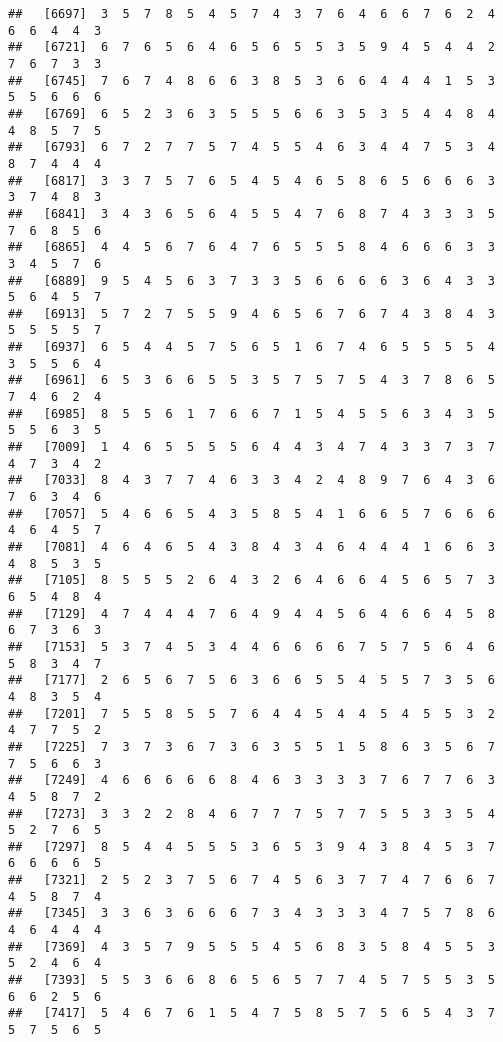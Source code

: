 \documentclass[
]{book}
\begin{document}
\begin{verbatim}
##   [6697]  3  5  7  8  5  4  5  7  4  3  7  6  4  6  6  7  6  2  4  6  6  4  4  3
##   [6721]  6  7  6  5  6  4  6  5  6  5  5  3  5  9  4  5  4  4  2  7  6  7  3  3
##   [6745]  7  6  7  4  8  6  6  3  8  5  3  6  6  4  4  4  1  5  3  5  5  6  6  6
##   [6769]  6  5  2  3  6  3  5  5  5  6  6  3  5  3  5  4  4  8  4  4  8  5  7  5
##   [6793]  6  7  2  7  7  5  7  4  5  5  4  6  3  4  4  7  5  3  4  8  7  4  4  4
##   [6817]  3  3  7  5  7  6  5  4  5  4  6  5  8  6  5  6  6  6  3  3  7  4  8  3
##   [6841]  3  4  3  6  5  6  4  5  5  4  7  6  8  7  4  3  3  3  5  7  6  8  5  6
##   [6865]  4  4  5  6  7  6  4  7  6  5  5  5  8  4  6  6  6  3  3  3  4  5  7  6
##   [6889]  9  5  4  5  6  3  7  3  3  5  6  6  6  6  3  6  4  3  3  5  6  4  5  7
##   [6913]  5  7  2  7  5  5  9  4  6  5  6  7  6  7  4  3  8  4  3  5  5  5  5  7
##   [6937]  6  5  4  4  5  7  5  6  5  1  6  7  4  6  5  5  5  5  4  3  5  5  6  4
##   [6961]  6  5  3  6  6  5  5  3  5  7  5  7  5  4  3  7  8  6  5  7  4  6  2  4
##   [6985]  8  5  5  6  1  7  6  6  7  1  5  4  5  5  6  3  4  3  5  5  5  6  3  5
##   [7009]  1  4  6  5  5  5  5  6  4  4  3  4  7  4  3  3  7  3  7  4  7  3  4  2
##   [7033]  8  4  3  7  7  4  6  3  3  4  2  4  8  9  7  6  4  3  6  7  6  3  4  6
##   [7057]  5  4  6  6  5  4  3  5  8  5  4  1  6  6  5  7  6  6  6  4  6  4  5  7
##   [7081]  4  6  4  6  5  4  3  8  4  3  4  6  4  4  4  1  6  6  3  4  8  5  3  5
##   [7105]  8  5  5  5  2  6  4  3  2  6  4  6  6  4  5  6  5  7  3  6  5  4  8  4
##   [7129]  4  7  4  4  4  7  6  4  9  4  4  5  6  4  6  6  4  5  8  6  7  3  6  3
##   [7153]  5  3  7  4  5  3  4  4  6  6  6  6  7  5  7  5  6  4  6  5  8  3  4  7
##   [7177]  2  6  5  6  7  5  6  3  6  6  5  5  4  5  5  7  3  5  6  4  8  3  5  4
##   [7201]  7  5  5  8  5  5  7  6  4  4  5  4  4  5  4  5  5  3  2  4  7  7  5  2
##   [7225]  7  3  7  3  6  7  3  6  3  5  5  1  5  8  6  3  5  6  7  7  5  6  6  3
##   [7249]  4  6  6  6  6  6  8  4  6  3  3  3  3  7  6  7  7  6  3  4  5  8  7  2
##   [7273]  3  3  2  2  8  4  6  7  7  7  5  7  7  5  5  3  3  5  4  5  2  7  6  5
##   [7297]  8  5  4  4  5  5  5  3  6  5  3  9  4  3  8  4  5  3  7  6  6  6  6  5
##   [7321]  2  5  2  3  7  5  6  7  4  5  6  3  7  7  4  7  6  6  7  4  5  8  7  4
##   [7345]  3  3  6  3  6  6  6  7  3  4  3  3  3  4  7  5  7  8  6  4  6  4  4  4
##   [7369]  4  3  5  7  9  5  5  5  4  5  6  8  3  5  8  4  5  5  3  5  2  4  6  4
##   [7393]  5  5  3  6  6  8  6  5  6  5  7  7  4  5  7  5  5  3  5  6  6  2  5  6
##   [7417]  5  4  6  7  6  1  5  4  7  5  8  5  7  5  6  5  4  3  7  5  7  5  6  5

\end{verbatim}
\end{document}
